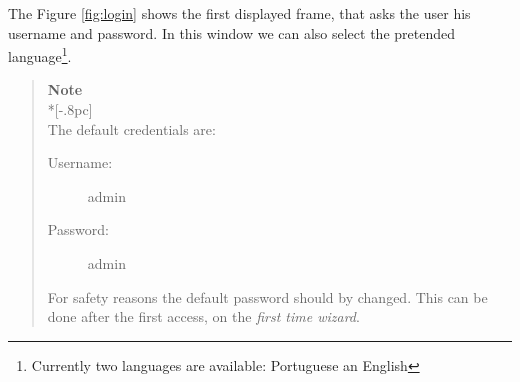 
The Figure \ref{fig:login} shows the first displayed frame, that asks the user his username and password. In this window we can also select the pretended language\footnote{Currently two languages are available: Portuguese an English}.

\begin{quote}
	{\large \bf Note} \\*[-.8pc]
	\underline{\hspace{6in}} \\
    The default credentials are:
	\begin{description}
        	\item[Username:] admin
	        \item[Password:] admin
	\end{description}
    For safety reasons the default password should by changed. This can be done after the first access, on the \textit{first time wizard}.

\end{quote}

